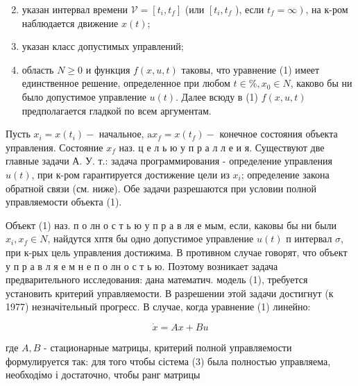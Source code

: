 \documentclass[10pt]{article}
\begin{document}
\begin{enumerate}

  \setcounter{enumi}{1}

  \item указан интервал времени $\mathscr{V}=\left[t_{i}, t_{f}\right]$ (или $\left[t_{i}, t_{f}\right.$ ), если $\left.t_{f}=\infty\right)$, на к-ром наблюдается движение $x(t)$;



  \item указан класс допустимых управлений;



  \item область $N \geqslant 0$ и функция $f(x, u, t)$ таковы, что уравнение (1) имеет единственное решение, определенное при любом $t \in \mathscr{\%}, x_{0} \in N$, каково бы ни было допустимое управление $u(t)$. Далее всюду в (1) $f(x, u, t)$ предполагается гладкой по всем аргументам.



\end{enumerate}



Пусть $x_{i}=x\left(t_{i}\right)-$ начальное, $\mathrm{a} x_{f}=x\left(t_{f}\right)-$ конечное состояния объекта управления. Состояние $x_{f}$ наз. ц е л ь ю у п р а л л е и я. Существуют две главные задачи А. У. т.: задача программирования - определение управления $u(t)$, при к-ром гарантируется достижение цели из $x_{i}$; определение закона обратной связи (см. ниже). Обе задачи разрешаются при условии полной управляемости объекта (1).



Объект (1) наз. п о лн о с т ь ю у п р а в ля е мым, если, каковы бы ни были $x_{i}, x_{f} \in N$, найдутся хптя бы одно допустимое управление $u(t)$ п интервал $\mathscr{\sigma}$, при к-рых цель управления достижима. В противном случае говорят, что объект у п р а в л я е м н е п о лн о с т ь ю. Поэтому возникает задача предварительного исследования: дана математич. модель (1), требуется установить критерий управляемости. В разрешении этой задачи достигнут (к 1977) незначітельный прогресс. В случае, когда уравнение (1) линейно:



\[

\dot{x}=A x+B u

\]



где $A, B$ - стационарные матрицы, критерий полной управляемости формулируется так: для того чтобы сістема (3) была полностью управляема, необходімо і достаточно, чтобы ранг матрицы
\end{document}
